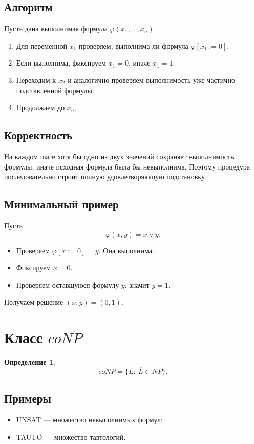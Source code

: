 \documentclass[12pt,a4paper]{article}
\theoremstyle{definition}
\newtheorem{definition}{Определение}[section]
\theoremstyle{plain}
\begin{document}
\subsection{Алгоритм}
Пусть дана выполнимая формула $\varphi(x_1,\dots,x_n)$.

\begin{enumerate}
\item Для переменной $x_1$ проверяем, выполнима ли формула $\varphi[x_1:=0]$.
\item Если выполнима, фиксируем $x_1=0$, иначе $x_1=1$.
\item Переходим к $x_2$ и аналогично проверяем выполнимость уже частично подставленной формулы.
\item Продолжаем до $x_n$.
\end{enumerate}

\subsection{Корректность}
На каждом шаге хотя бы одно из двух значений сохраняет выполнимость формулы, иначе исходная формула была бы невыполнима. Поэтому процедура последовательно строит полную удовлетворяющую подстановку.

\subsection{Минимальный пример}
Пусть
\[
\varphi(x,y)=x\vee y.
\]
\begin{itemize}
\item Проверяем $\varphi[x:=0]=y$. Она выполнима.
\item Фиксируем $x=0$.
\item Проверяем оставшуюся формулу $y$:
значит $y=1$.
\end{itemize}
Получаем решение $(x,y)=(0,1)$.

\section{Класс \texorpdfstring{$coNP$}{coNP}}

\begin{definition}
\[
coNP=\{L:\ \overline L\in NP\}.
\]
\end{definition}

\subsection{Примеры}
\begin{itemize}
\item \textsc{UNSAT} --- множество невыполнимых формул;
\item \textsc{TAUTO} --- множество тавтологий.
\end{itemize}
\end{document}
